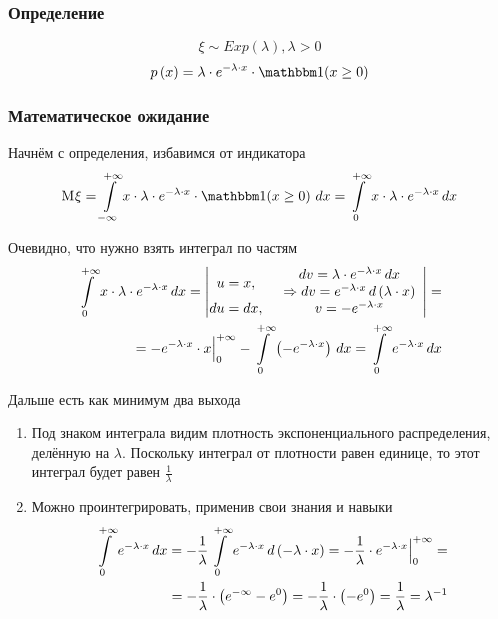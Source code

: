 \subsubsection{Определение}
$$\xi \sim Exp\left( \lambda \right), \lambda>0$$
$$\pdf{x} = \lambda \cdot e^{-\lambda \cdot x} \cdot \indicator{x \ge 0}$$
\subsubsection{Математическое ожидание}
Начнём с определения, избавимся от индикатора
$$\mean{\xi}
    = \integral{-\infty}{+\infty}{x}{
        x \cdot \lambda \cdot e^{-\lambda \cdot x} \cdot \indicator{x \ge 0}}
    = \integral{0}{+\infty}{x}{x \cdot \lambda \cdot e^{-\lambda \cdot x}}$$

Очевидно, что нужно взять интеграл по частям
\begin{align*}
\integral{0}{+\infty}{x}{x \cdot \lambda \cdot e^{-\lambda \cdot x}}
    = \begin{vmatrix}
        u = x, & \begin{array}{c}
            dv = \lambda \cdot e^{-\lambda \cdot x} \, dx\\
            \Rightarrow
                dv = e^{-\lambda \cdot x} \, d\left( \lambda \cdot x \right)
           \end{array}\\
        du = dx, & v = - e^{-\lambda \cdot x}
    \end{vmatrix} = \\
    = \Bigl. - e^{-\lambda \cdot x} \cdot x \Bigr|_0^{+\infty}
        - \integral{0}{+\infty}{x}{\left( - e^{-\lambda \cdot x} \right)}
    = \integral{0}{+\infty}{x}{e^{-\lambda \cdot x}}
\end{align*}

Дальше есть как минимум два выхода
\begin{enumerate}
    \item Под знаком интеграла видим
        плотность экспоненциального распределения, делённую на $\lambda$.
        Поскольку интеграл от плотности равен единице,
        то этот интеграл будет равен $\frac{1}{\lambda}$
    \item Можно проинтегрировать, применив свои знания и навыки
        \begin{align*}
            \integral{0}{+\infty}{x}{e^{-\lambda \cdot x}}
                = - \frac{1}{\lambda} \integral{0}{+\infty}
                    {\left( - \lambda \cdot x \right)}{e^{-\lambda \cdot x}}
                = - \frac{1}{\lambda}
                    \cdot \Bigl. e^{-\lambda \cdot x} \Bigr|_0^{+\infty} = \\
                = - \frac{1}{\lambda} \cdot \left( e^{-\infty} - e^0 \right)
                = - \frac{1}{\lambda} \cdot \left( - e^0 \right)
                = \frac{1}{\lambda} = \lambda^{-1}
        \end{align*}
\end{enumerate}
